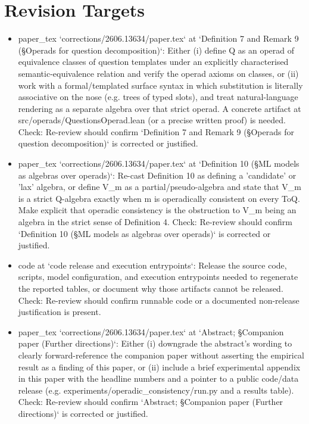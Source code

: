 \documentclass[11pt]{article}
\begin{document}
\section*{Revision Targets}
\begin{itemize}[leftmargin=*]
  \item [open] paper\_tex `corrections/2606.13634/paper.tex` at `Definition 7 and Remark 9 (§Operads for question decomposition)`: Either (i) define Q as an operad of equivalence classes of question templates under an explicitly characterised semantic-equivalence relation and verify the operad axioms on classes, or (ii) work with a formal/templated surface syntax in which substitution is literally associative on the nose (e.g. trees of typed slots), and treat natural-language rendering as a separate algebra over that strict operad. A concrete artifact at src/operads/QuestionsOperad.lean (or a precise written proof) is needed. Check: Re-review should confirm `Definition 7 and Remark 9 (§Operads for question decomposition)` is corrected or justified.
  \item [open] paper\_tex `corrections/2606.13634/paper.tex` at `Definition 10 (§ML models as algebras over operads)`: Re-cast Definition 10 as defining a 'candidate' or 'lax' algebra, or define V\_m as a partial/pseudo-algebra and state that V\_m is a strict Q-algebra exactly when m is operadically consistent on every ToQ. Make explicit that operadic consistency is the obstruction to V\_m being an algebra in the strict sense of Definition 4. Check: Re-review should confirm `Definition 10 (§ML models as algebras over operads)` is corrected or justified.
  \item [open] code at `code release and execution entrypoints`: Release the source code, scripts, model configuration, and execution entrypoints needed to regenerate the reported tables, or document why those artifacts cannot be released. Check: Re-review should confirm runnable code or a documented non-release justification is present.
  \item [open] paper\_tex `corrections/2606.13634/paper.tex` at `Abstract; §Companion paper (Further directions)`: Either (i) downgrade the abstract's wording to clearly forward-reference the companion paper without asserting the empirical result as a finding of this paper, or (ii) include a brief experimental appendix in this paper with the headline numbers and a pointer to a public code/data release (e.g. experiments/operadic\_consistency/run.py and a results table). Check: Re-review should confirm `Abstract; §Companion paper (Further directions)` is corrected or justified.

\end{itemize}
\end{document}
